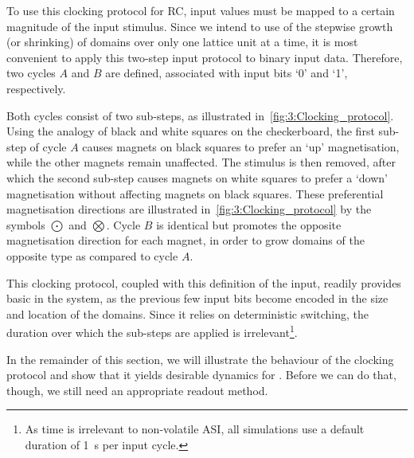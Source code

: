 To use this clocking protocol for RC, input values must be mapped to a certain magnitude of the input stimulus.
Since we intend to use of the stepwise growth (or shrinking) of domains over only one lattice unit at a time, it is most convenient to apply this two-step input protocol to binary input data.
Therefore, two cycles $A$ and $B$ are defined, associated with input bits `0' and `1', respectively. \par
Both cycles consist of two sub-steps, as illustrated in~\cref{fig:3:Clocking_protocol}.
Using the analogy of black and white squares on the checkerboard, the first sub-step of cycle $A$ causes magnets on black squares to prefer an `up' magnetisation, while the other magnets remain unaffected.
The stimulus is then removed, after which the second sub-step causes magnets on white squares to prefer a `down' magnetisation without affecting magnets on black squares.
These preferential magnetisation directions are illustrated in~\cref{fig:3:Clocking_protocol} by the symbols $\bigodot$ and $\bigotimes$.
Cycle $B$ is identical but promotes the opposite magnetisation direction for each magnet, in order to grow domains of the opposite type as compared to cycle $A$. \\\par
This clocking protocol, coupled with this definition of the input, readily provides basic  in the system, as the previous few input bits become encoded in the size and location of the domains.
Since it relies on deterministic switching, the duration over which the sub-steps are applied is irrelevant\footnote{
	As time is irrelevant to non-volatile ASI, all simulations use a default duration of \SI{1}{\second} per input cycle.
}. \par
In the remainder of this section, we will illustrate the behaviour of the clocking protocol and show that it yields desirable dynamics for .
Before we can do that, though, we still need an appropriate readout method.

